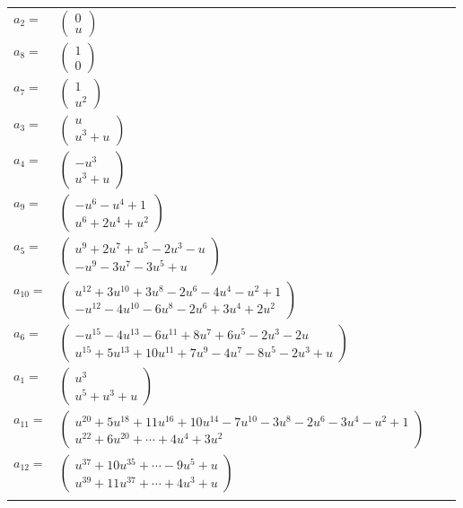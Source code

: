 \documentclass[1p]{elsarticle_modified}
\theoremstyle{definition}
\begin{document}
\begin{tabular}{m{7pt} m{180pt} m{7pt} m{180pt} }
\flushright $a_{2}=$&$\begin{pmatrix}0\\u\end{pmatrix}$ \\
\flushright $a_{8}=$&$\begin{pmatrix}1\\0\end{pmatrix}$ \\
\flushright $a_{7}=$&$\begin{pmatrix}1\\u^2\end{pmatrix}$ \\
\flushright $a_{3}=$&$\begin{pmatrix}u\\u^3+u\end{pmatrix}$ \\
\flushright $a_{4}=$&$\begin{pmatrix}- u^3\\u^3+u\end{pmatrix}$ \\
\flushright $a_{9}=$&$\begin{pmatrix}- u^6- u^4+1\\u^6+2 u^4+u^2\end{pmatrix}$ \\
\flushright $a_{5}=$&$\begin{pmatrix}u^9+2 u^7+u^5-2 u^3- u\\- u^9-3 u^7-3 u^5+u\end{pmatrix}$ \\
\flushright $a_{10}=$&$\begin{pmatrix}u^{12}+3 u^{10}+3 u^8-2 u^6-4 u^4- u^2+1\\- u^{12}-4 u^{10}-6 u^8-2 u^6+3 u^4+2 u^2\end{pmatrix}$ \\
\flushright $a_{6}=$&$\begin{pmatrix}- u^{15}-4 u^{13}-6 u^{11}+8 u^7+6 u^5-2 u^3-2 u\\u^{15}+5 u^{13}+10 u^{11}+7 u^9-4 u^7-8 u^5-2 u^3+u\end{pmatrix}$ \\
\flushright $a_{1}=$&$\begin{pmatrix}u^3\\u^5+u^3+u\end{pmatrix}$ \\
\flushright $a_{11}=$&$\begin{pmatrix}u^{20}+5 u^{18}+11 u^{16}+10 u^{14}-7 u^{10}-3 u^8-2 u^6-3 u^4- u^2+1\\u^{22}+6 u^{20}+\cdots+4 u^4+3 u^2\end{pmatrix}$ \\
\flushright $a_{12}=$&$\begin{pmatrix}u^{37}+10 u^{35}+\cdots-9 u^5+u\\u^{39}+11 u^{37}+\cdots+4 u^3+u\end{pmatrix}$\\&\end{tabular}
\end{document}

